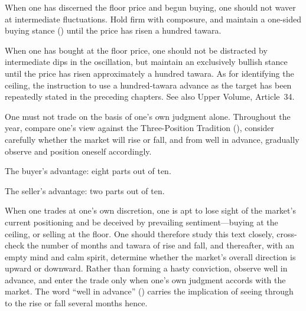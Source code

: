 \begin{sokyubox}
{\small\itshape\color{sokyubar} }

\medskip
When one has discerned the floor price and begun buying, one should not
waver at intermediate fluctuations. Hold firm with composure, and maintain
a one-sided buying stance () until the price has risen
a hundred tawara.
\end{sokyubox}

\commentary
When one has bought at the floor price, one should not be distracted by
intermediate dips in the oscillation, but maintain an exclusively bullish
stance until the price has risen approximately a hundred tawara. As for
identifying the ceiling, the instruction to use a hundred-tawara advance as
the target has been repeatedly stated in the preceding chapters. See also
Upper Volume, Article~34.


\begin{sokyubox}
{\small\itshape\color{sokyubar} }

\medskip
One must not trade on the basis of one's own judgment alone. Throughout the
year, compare one's view against the Three-Position Tradition
(), consider carefully whether the market will
rise or fall, and from well in advance, gradually observe and position
oneself accordingly.

The buyer's advantage: eight parts out of ten.

The seller's advantage: two parts out of ten.
\end{sokyubox}

\commentary
When one trades at one's own discretion, one is apt to lose sight of the
market's current positioning and be deceived by prevailing sentiment---buying
at the ceiling, or selling at the floor. One should therefore study this
text closely, cross-check the number of months and tawara of rise and fall,
and thereafter, with an empty mind and calm spirit, determine whether the
market's overall direction is upward or downward. Rather than forming a
hasty conviction, observe well in advance, and enter the trade only when
one's own judgment accords with the market. The word ``well in advance''
() carries the implication of seeing through to the rise
or fall several months hence.


